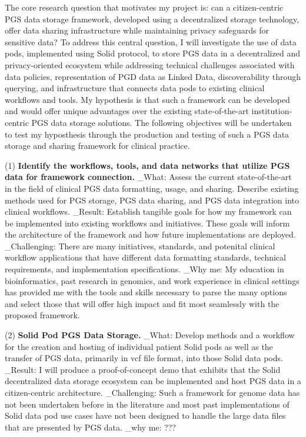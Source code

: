 \documentclass[11pt]{article}
\begin{document}
The core research question that motivates my project is: can a citizen-centric PGS data storage framework, developed using a decentralized storage technology, offer data sharing infrastructure while maintaining privacy safeguards for sensitive data? 
To address this central question, I will investigate the use of data pods, implemented using Solid protocol, to store PGS data in a decentralized and privacy-oriented ecosystem while addressing technical challenges associated with data policies, representation of PGD data as Linked Data, discoverability through querying, and infrastructure that connects data pods to existing clinical workflows and tools. 
My hypothesis is that such a framework can be developed and would offer unique advantages over the existing state-of-the-art institution-centric PGS data storage solutions. 
The following objectives will be undertaken to test my hyposthesis through the production and testing of such a PGS data storage and sharing framework for clinical practice.

(1) \textbf{Identify the workflows, tools, and data networks that utilize PGS data for framework connection.}
_What: Assess the current state-of-the-art in the field of clinical PGS data formatting, usage, and sharing. 
Describe existing methods used for PGS storage, PGS data sharing, and PGS data integration into clinical workflows.
_Result: Establish tangible goals for how my framework can be implemented into existing workflows and initiatives. These goals will inform the architecture of the framework and how future implementations are deployed. 
_Challenging: There are many initiatives, standards, and potenital clinical workflow applications that have different data formatting standards, technical requirements, and implementation specifications. 
_Why me: My education in bioinformatics, past research in genomics, and work experience in clinical settings has provided me with the tools and skills necessary to parse the many options and select those that will offer high impact and fit most seamlessly with the proposed framework.


(2) \textbf{Solid Pod PGS Data Storage.}
_What: Develop methods and a workflow for the creation and hosting of individual patient Solid pods as well as the transfer of PGS data, primarily in vcf file format, into those Solid data pods. 
_Result: I will produce a proof-of-concept demo that exhibits that the Solid decentralized data storage ecosystem can be implemented and host PGS data in a citizen-centric architecture.
_Challenging: Such a framework for genome data has not been undertaken before in the literature and most past implementations of Solid data pod use cases have not been designed to handle the large data files that are presented by PGS data. 
_why me: ???
\end{document}
